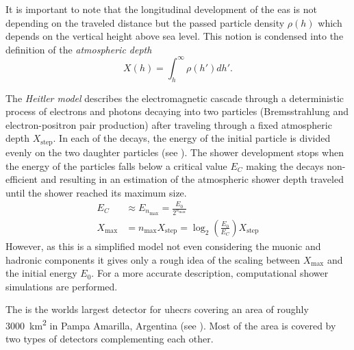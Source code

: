 It is important to note that the longitudinal development of the \gls{eas} is not depending on the traveled distance but the passed particle density \(\rho(h)\) which depends on the vertical height above sea level. This notion is condensed into the definition of the \emph{atmospheric depth}\begin{equation}
    X(h)=\int_h^\infty \rho(h') dh' .
\end{equation}

The \emph{Heitler model} describes the electromagnetic cascade through a deterministic process of electrons and photons decaying into two particles (Bremsstrahlung and electron-positron pair production) after traveling through a fixed atmospheric depth \(X_\text{step}\). In each of the decays, the energy of the initial particle is divided evenly on the two daughter particles (see ). The shower development stops when the energy of the particles falls below a critical value \(E_C\) making the decays non-efficient and resulting in an estimation of the atmospheric shower depth traveled until the shower reached its maximum size.
\begin{align}
    E_C &\approx E_{n_{\max}} = \frac{E_0}{2^{n_{\max}}}\\
    X_{\max} &= n_{\max} X_\text{step} = \log_2 \left( \frac{E_0}{E_C}\right) X_\text{step}
\end{align}
However, as this is a simplified model not even considering the muonic and hadronic components it gives only a rough idea of the scaling between \(X_{\max}\) and the initial energy \(E_0\). For a more accurate description, computational shower simulations are performed.

\label{sssec:pao}

The \pao{} is the worlds largest detector for \glspl{uhecr} covering an area of roughly \SI{3000}{\square\kilo\meter} in Pampa Amarilla, Argentina (see ). Most of the area is covered by two types of detectors complementing each other.~\cite{ThePierreAugerCollaboration2016}

